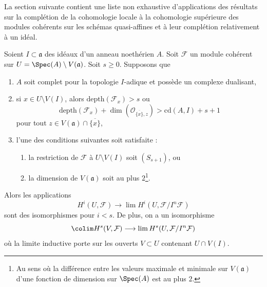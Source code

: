 \noindent
La section suivante contient une liste non exhaustive
d'applications des résultats
sur la complétion de la cohomologie locale à la cohomologie supérieure
des modules cohérents sur les schémas quasi-affines et à leur
complétion relativement à un idéal.

\begin{proposition}
\label{proposition-application-higher}
Soient $I \subset \mathfrak a$ des idéaux d'un anneau noethérien $A$.
Soit $\mathcal{F}$ un module cohérent sur
$U = \Spec(A) \setminus V(\mathfrak a)$.
Soit $s \geq 0$.
Supposons que
\begin{enumerate}
\item $A$ soit complet pour la topologie $I$-adique et possède un complexe dualisant,
\item si $x \in U \setminus V(I)$, alors
$\text{depth}(\mathcal{F}_x) > s$ ou
$$
\text{depth}(\mathcal{F}_x) +
\dim(\mathcal{O}_{\overline{\{x\}}, z}) > \text{cd}(A, I) + s + 1
$$
pour tout $z \in V(\mathfrak a) \cap \overline{\{x\}}$,
\item l'une des conditions suivantes soit satisfaite :
\begin{enumerate}
\item la restriction de $\mathcal{F}$ à $U \setminus V(I)$
soit $(S_{s + 1})$, ou
\item la dimension de $V(\mathfrak a)$ soit au plus $2$\footnote{Au
sens où la différence entre les valeurs maximale et minimale
sur $V(\mathfrak a)$ d'une fonction de dimension sur $\Spec(A)$ est au plus $2$.}.
\end{enumerate}
\end{enumerate}
Alors les applications
$$
H^i(U, \mathcal{F})
\longrightarrow
\lim H^i(U, \mathcal{F}/I^n\mathcal{F})
$$
sont des isomorphismes pour $i < s$. De plus, on a un isomorphisme
$$
\colim H^s(V, \mathcal{F})
\longrightarrow
\lim H^s(U, \mathcal{F}/I^n\mathcal{F})
$$
où la limite inductive porte sur les ouverts $V \subset U$ contenant $U \cap V(I)$.
\end{proposition}

